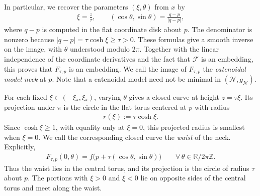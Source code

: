 \documentclass[a4paper,11pt,oneside,reqno]{amsart}
\numberwithin{equation}{section}
\theoremstyle{definition}
\begin{document}
%
In particular, we recover the parameters $(\xi,\theta)$ from $x$ by
%
\begin{align*}
    \xi=\frac z\tau,
    \qquad
    (\cos\theta,\sin\theta)=\frac{q-p}{|q-p|},
\end{align*}
%
where $q-p$ is computed in the flat coordinate disk
about $p$. The denominator is nonzero because
$|q-p|=\tau\cosh\xi\geq\tau>0$.
These formulas give a smooth inverse on the image,
with $\theta$ understood modulo $2\pi$.
Together with the linear independence of the coordinate
derivatives and the fact that $\mathcal F$ is an embedding,
this proves that $F_{\tau,p}$ is an embedding. We call the image of $F_{\tau,p}$ the
\textit{catenoidal model neck} at $p$. Note that a catenoidal model need not be minimal in $(\mathcal N,g_{\mathcal N})$.

For each fixed $\xi\in(-\xi_*,\xi_*)$, varying $\theta$
gives a closed curve at height $z=\tau\xi$.
Its projection under $\pi$ is the circle in the flat
torus centered at $p$ with radius
%
\begin{align*}
    r(\xi):=\tau\cosh\xi.
\end{align*}
%
Since $\cosh\xi\geq1$, with equality only at $\xi=0$,
this projected radius is smallest when $\xi=0$.
We call the corresponding closed curve the
\textit{waist} of the neck. Explicitly,
%
\begin{align*}
    F_{\tau,p}(0,\theta)
    =f\bigl(p+\tau(\cos\theta,\sin\theta)\bigr)
    \qquad\forall\,\theta\in\mathbb R/2\pi\mathbb Z.
\end{align*}
%
Thus the waist lies in the central torus, and its
projection is the circle of radius $\tau$ about $p$.
The portions with $\xi>0$ and $\xi<0$ lie on opposite
sides of the central torus and meet along the waist.
\end{document}
